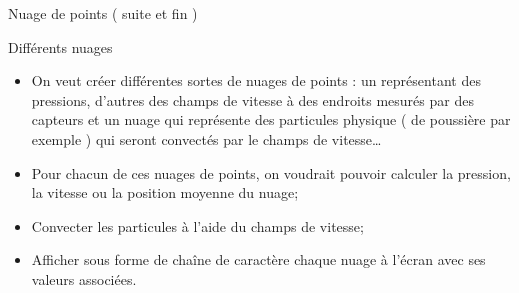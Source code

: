 \documentclass[compress,10pt,aspectratio=169]{beamer}
\begin{document}
\begin{frame}{Nuage de points ( suite et fin )}
  \scriptsize
\begin{exampleblock}{\small Différents nuages}
  \begin{itemize}
  \item On veut créer différentes sortes de nuages de points : un représentant des pressions, 
        d'autres des champs de vitesse à des endroits mesurés par des 
        capteurs et un nuage qui représente des particules physique 
        ( de poussière par exemple ) qui seront convectés par le champs 
        de vitesse\ldots
  \item Pour chacun de ces nuages de points, on voudrait pouvoir calculer la pression, la vitesse ou la position moyenne du nuage;
  \item Convecter les particules à l'aide du champs de vitesse;
  \item Afficher sous forme de chaîne de caractère chaque nuage à l'écran avec ses valeurs associées.
\end{itemize}
\end{exampleblock}
\end{frame}
\end{document}
